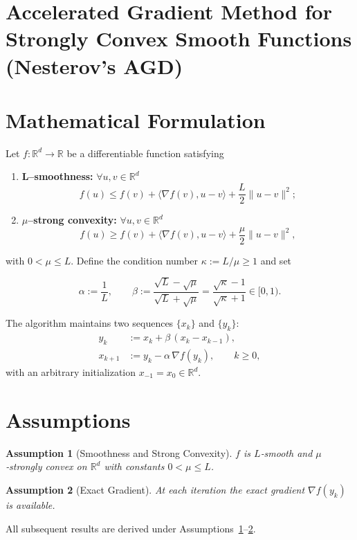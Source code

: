 \documentclass{article}
\newtheorem{assumption}{Assumption}
\begin{document}
\section*{Accelerated Gradient Method for Strongly Convex Smooth Functions (Nesterov’s AGD)}

\section*{Mathematical Formulation}
Let $f:\mathbb{R}^{d}\rightarrow\mathbb{R}$ be a differentiable function satisfying  

\begin{enumerate}[label=(\alph*)]
    \item \textbf{L–smoothness:}  $\forall u,v\in\mathbb{R}^{d}$
    \[
    f(u)\le f(v)+\langle\nabla f(v),u-v\rangle+\frac{L}{2}\|u-v\|^{2};
    \tag{1}
    \]
    \item \textbf{$\mu$–strong convexity:} $\forall u,v\in\mathbb{R}^{d}$
    \[
    f(u)\ge f(v)+\langle\nabla f(v),u-v\rangle+\frac{\mu}{2}\|u-v\|^{2},
    \tag{2}
    \]
\end{enumerate}
with $0<\mu\le L$.  
Define the condition number $\kappa:=L/\mu\ge 1$ and set  

\[
\alpha:=\frac{1}{L},\qquad 
\beta:=\frac{\sqrt{L}-\sqrt{\mu}}{\sqrt{L}+\sqrt{\mu}}
      =\frac{\sqrt{\kappa}-1}{\sqrt{\kappa}+1}\in[0,1).
\tag{3}
\]

The algorithm maintains two sequences $\{x_{k}\}$ and $\{y_{k}\}$:
\[
\boxed{
\begin{aligned}
y_{k}      &:= x_{k}+ \beta\,(x_{k}-x_{k-1}),\\[2mm]
x_{k+1}    &:= y_{k}-\alpha\,\nabla f(y_{k}),\qquad k\ge 0,
\end{aligned}}
\tag{4}
\]
with an arbitrary initialization $x_{-1}=x_{0}\in\mathbb{R}^{d}$.

\section*{Assumptions}
\begin{assumption}[Smoothness and Strong Convexity]\label{ass:sc}
$f$ is $L$‑smooth and $\mu$‑strongly convex on $\mathbb{R}^{d}$ with constants
$0<\mu\le L$.
\end{assumption}
\begin{assumption}[Exact Gradient]\label{ass:grad}
At each iteration the exact gradient $\nabla f(y_{k})$ is available.
\end{assumption}
All subsequent results are derived under Assumptions~\ref{ass:sc}–\ref{ass:grad}.
\end{document}
